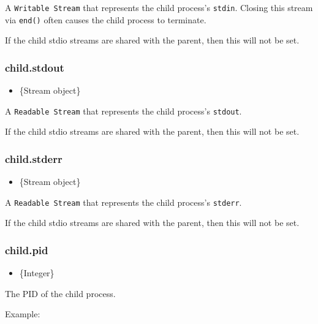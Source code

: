 A \texttt{Writable Stream} that represents the child process's
\texttt{stdin}. Closing this stream via \texttt{end()} often causes the
child process to terminate.

If the child stdio streams are shared with the parent, then this will
not be set.

\subsubsection{child.stdout}\label{child.stdout}

\begin{itemize}
\itemsep1pt\parskip0pt
\item
  \{Stream object\}
\end{itemize}

A \texttt{Readable Stream} that represents the child process's
\texttt{stdout}.

If the child stdio streams are shared with the parent, then this will
not be set.

\subsubsection{child.stderr}\label{child.stderr}

\begin{itemize}
\itemsep1pt\parskip0pt
\item
  \{Stream object\}
\end{itemize}

A \texttt{Readable Stream} that represents the child process's
\texttt{stderr}.

If the child stdio streams are shared with the parent, then this will
not be set.

\subsubsection{child.pid}\label{child.pid}

\begin{itemize}
\itemsep1pt\parskip0pt
\item
  \{Integer\}
\end{itemize}

The PID of the child process.

Example:

\begin{Shaded}
\begin{Highlighting}[]
 \NormalTok{(}\NormalTok{,}
    \NormalTok{(}\NormalTok{, [}\NormalTok{]);}

\NormalTok{(} \NormalTok{+ }\NormalTok{);}
\NormalTok{();}
\end{Highlighting}
\end{Shaded}

